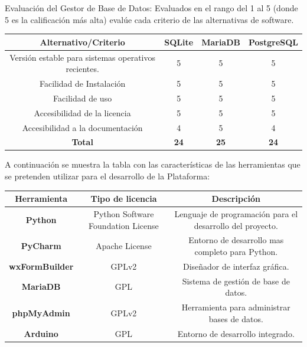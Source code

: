 \documentclass[12pt]{report}%
\begin{document}
\newpage
Evaluación del Gestor de Base de Datos: Evaluados en el rango del 1 al 5 (donde 5 es la calificación más alta) evalúe cada criterio de las alternativas de software.

\begin{table}[htbp]
\begin{tabular}{|c|c|c|c|}
\hline
\rowcolor[HTML]{68CBD0} 
\textbf{Alternativo/Criterio}                       & \textbf{SQLite} & \textbf{MariaDB} & \textbf{PostgreSQL} \\ \hline
Versión estable para sistemas operativos recientes. & 5               & 5                & 5                   \\ \hline
Facilidad de Instalación                            & 5               & 5                & 5                   \\ \hline
Facilidad de uso                                    & 5               & 5                & 5                   \\ \hline
Accesibilidad de la licencia                        & 5               & 5                & 5                   \\ \hline
Accesibilidad a la documentación                    & 4               & 5                & 4                   \\ \hline
\textbf{Total}                                      & \textbf{24}     & \textbf{25}      & \textbf{24}         \\ \hline
\end{tabular}
\end{table}

A continuación se muestra la tabla con las características de las herramientas que se pretenden utilizar para el desarrollo de la Plataforma:

\begin{table}[htbp]
\begin{tabular}{|c|c|c|}
\hline
\rowcolor[HTML]{68CBD0} 
\textbf{Herramienta}   & \textbf{Tipo de licencia}          & \textbf{Descripción}                                      \\ \hline
\textbf{Python}        & Python Software Foundation License & Lenguaje de programación para el desarrollo del proyecto. \\ \hline
\textbf{PyCharm}       & Apache License                     & Entorno de desarrollo mas completo para Python.           \\ \hline
\textbf{wxFormBuilder} & GPLv2                              & Diseñador de interfaz gráfica.                            \\ \hline
\textbf{MariaDB}       & GPL                                & Sistema de gestión de base de datos.                      \\ \hline
\textbf{phpMyAdmin}    & GPLv2                              & Herramienta para administrar bases de datos.              \\ \hline
\textbf{Arduino}       & GPL                                & Entorno de desarrollo integrado.                          \\ \hline
\end{tabular}
\end{table}
\end{document}
